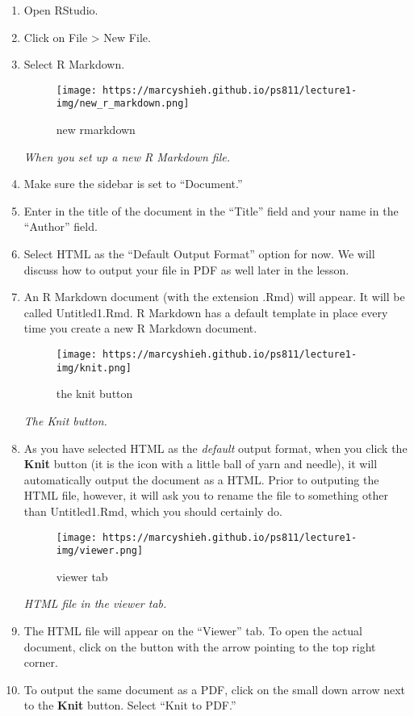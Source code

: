 \documentclass[
]{book}
\begin{document}
\begin{enumerate}
\def\labelenumi{\arabic{enumi}.}
\item
  Open RStudio.
\item
  Click on File \textgreater{} New File.
\item
  Select R Markdown.

  \begin{figure}
  \centering
  \texttt{[image: https://marcyshieh.github.io/ps811/lecture1-img/new\_r\_markdown.png]}
  \caption{new rmarkdown}
  \end{figure}

  \emph{When you set up a new R Markdown file.}
\item
  Make sure the sidebar is set to ``Document.''
\item
  Enter in the title of the document in the ``Title'' field and your name in the ``Author'' field.
\item
  Select HTML as the ``Default Output Format'' option for now. We will discuss how to output your file in PDF as well later in the lesson.
\item
  An R Markdown document (with the extension .Rmd) will appear. It will be called Untitled1.Rmd. R Markdown has a default template in place every time you create a new R Markdown document.

  \begin{figure}
  \centering
  \texttt{[image: https://marcyshieh.github.io/ps811/lecture1-img/knit.png]}
  \caption{the knit button}
  \end{figure}

  \emph{The Knit button.}
\item
  As you have selected HTML as the \emph{default} output format, when you click the \textbf{Knit} button (it is the icon with a little ball of yarn and needle), it will automatically output the document as a HTML. Prior to outputing the HTML file, however, it will ask you to rename the file to something other than Untitled1.Rmd, which you should certainly do.

  \begin{figure}
  \centering
  \texttt{[image: https://marcyshieh.github.io/ps811/lecture1-img/viewer.png]}
  \caption{viewer tab}
  \end{figure}

  \emph{HTML file in the viewer tab.}
\item
  The HTML file will appear on the ``Viewer'' tab. To open the actual document, click on the button with the arrow pointing to the top right corner.
\item
  To output the same document as a PDF, click on the small down arrow next to the \textbf{Knit} button. Select ``Knit to PDF.''
\end{enumerate}
\end{document}
